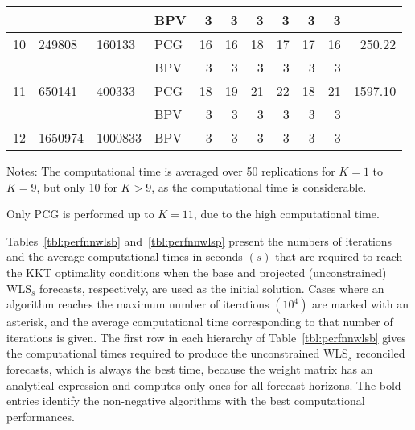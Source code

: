 \documentclass[11pt]{article}
\newcommand{\0}{\phantom{0}}
\begin{document}
\begin{table}[ht]
\begin{threeparttable}
\begin{tabular}{llllrrrrrrr}
			    &         &         & BPV & 3                                          & 3   & 3         & 3         & 3   & 3   & \bm{$6.45$}    \\
			\midrule
			10  & 249808  & 160133  & PCG & 16                                         & 16  & 18        & 17        & 17  & 16  & 250.22         \\
			    &         &         & BPV & 3                                          & 3   & 3         & 3         & 3   & 3   & \bm{$21.00$}   \\
			\midrule
			11  & 650141  & 400333  & PCG & 18                                         & 19  & 21        & 22        & 18  & 21  & 1597.10        \\
			    &         &         & BPV & 3                                          & 3   & 3         & 3         & 3   & 3   & \bm{$56.84$}   \\
			\midrule
			12  & 1650974 & 1000833 & BPV & 3                                          & 3   & 3         & 3         & 3   & 3   & \bm{$3247.09$} \\
			\bottomrule
		\end{tabular}
		\begin{tablenotes}
			\item [] Notes: The computational time is averaged over 50 replications for $K = 1$ to $K = 9$, but only 10 for $K > 9$, as the computational time is considerable.
			\item [] Only PCG is performed up to $K = 11$, due to the high computational time.
		\end{tablenotes}
	\end{threeparttable}
\end{table}


Tables~\ref{tbl:perfnnwlsb} and~\ref{tbl:perfnnwlsp} present the numbers of iterations and the average computational times in seconds $(s)$ that are required to reach the KKT optimality conditions when the base and projected (unconstrained) WLS$_{s}$ forecasts, respectively, are used as the initial solution. Cases where an algorithm reaches the maximum number of iterations $(10^{4})$ are marked with an asterisk, and the average computational time corresponding to that number of iterations is given. The first row in each hierarchy of Table~\ref{tbl:perfnnwlsb} gives the computational times required to produce the unconstrained WLS$_{s}$ reconciled forecasts, which is always the best time, because the weight matrix has an analytical expression and computes only ones for all forecast horizons. The bold entries identify the non-negative algorithms with the best computational performances.
\end{document}
